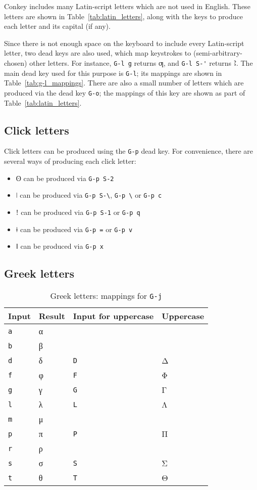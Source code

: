 \documentclass[oneside]{memoir}
\newcommand{\key}{\verb}
\newcommand{\keynv}{\texttt}
\newcommand{\out}[1]{\colorbox{gray!20}{#1}}
\begin{document}
Conkey includes many Latin-script letters which are not used in English.
These letters are shown in Table~\ref{tab:latin_letters}, along with the keys to produce each letter and its capital (if any).

Since there is not enough space on the keyboard to include every Latin-script letter,
  two dead keys are also used, which map keystrokes to (semi-arbitrary-chosen) other letters.
For instance, \key|G-l g| returns \out{ƣ}, and \key|G-l S-'| returns \out{Ꜣ}.
The main dead key used for this purpose is \key|G-l|;
  its mappings are shown in Table~\ref{tab:g-l_mappings}.
There are also a small number of letters which are produced via the dead key \key|G-o|;
  the mappings of this key are shown as part of Table~\ref{tab:latin_letters}.

\subsection{Click letters}
\label{sec:clicks}

Click letters can be produced using the \key|G-p| dead key.
For convenience, there are several ways of producing each click letter:

\begin{itemize}[noitemsep]
\item \out{ʘ} can be produced via \key|G-p S-2|
\item \out{ǀ} can be produced via \key|G-p S-\|, \key|G-p \| or \key|G-p c|
\item \out{ǃ} can be produced via \key|G-p S-1| or \key|G-p q|
\item \out{ǂ} can be produced via \key|G-p =| or \key|G-p v|
\item \out{ǁ} can be produced via \key|G-p x|
\end{itemize}

\subsection{Greek letters}
\label{sec:greek_letters}

\begin{table}
\centering
\caption{Greek letters: mappings for \keynv{G-j}}
\label{tab:greek_letters}
\begin{tabular}{llll}
\toprule
Input & Result & Input for uppercase & Uppercase \\
\midrule
\key|a| & α & & \\
\key|b| & β & & \\
\key|d| & δ & \key|D| & Δ \\
\key|f| & φ & \key|F| & Φ \\
\key|g| & γ & \key|G| & Γ \\
\key|l| & λ & \key|L| & Λ \\
\key|m| & μ & & \\
\key|p| & π & \key|P| & Π \\
\key|r| & ρ & & \\
\key|s| & σ & \key|S| & Σ \\
\key|t| & θ & \key|T| & Θ \\
\bottomrule
\end{tabular}
\end{table}
\end{document}
